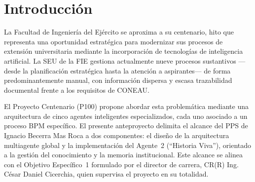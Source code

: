 \documentclass[a4paper, 12pt]{article}
\begin{document}
\begin{acronym}[CONEAU]
\end{acronym}

\section{Introducci\'on}

La Facultad de Ingenier\'ia del Ej\'ercito se aproxima a su centenario, hito que representa una oportunidad estrat\'egica para modernizar sus procesos de extensi\'on universitaria mediante la incorporaci\'on de tecnolog\'ias de inteligencia artificial. La \ac{SEU} de la \ac{FIE} gestiona actualmente nueve procesos sustantivos ---desde la planificaci\'on estrat\'egica hasta la atenci\'on a aspirantes--- de forma predominantemente manual, con informaci\'on dispersa y escasa trazabilidad documental frente a los requisitos de \ac{CONEAU}.

El Proyecto Centenario (\ac{P100}) propone abordar esta problem\'atica mediante una arquitectura de cinco agentes inteligentes especializados, cada uno asociado a un proceso \ac{BPM} espec\'ifico. El presente anteproyecto delimita el alcance del PPS de Ignacio Becerra Mas Roca a dos componentes: el dise\~no de la arquitectura multiagente global y la implementaci\'on del Agente~2 (``Historia Viva''), orientado a la gesti\'on del conocimiento y la memoria institucional. Este alcance se alinea con el Objetivo Espec\'ifico~1 formulado por el director de carrera, CR(R) Ing. C\'esar Daniel Cicerchia, quien supervisa el proyecto en su totalidad.
\end{document}
